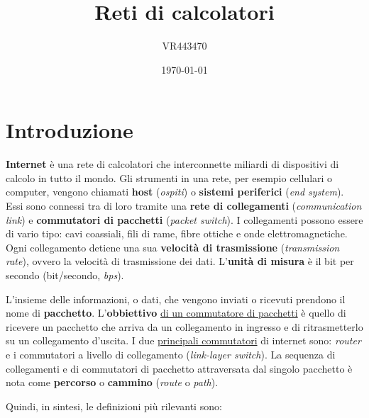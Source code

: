 \documentclass[a4paper]{article}
\begin{document}
	\author{VR443470}
	\title{Reti di calcolatori}
	\date{\printdayoff\today}
	\maketitle
	
	\newpage
	
	\tableofcontents
	
	\newpage
	
	\section{Introduzione}
	
	\textbf{Internet} è una rete di calcolatori che interconnette miliardi di dispositivi di calcolo in tutto il mondo. Gli strumenti in una rete, per esempio cellulari o computer, vengono chiamati \textbf{host} (\emph{ospiti}) o \textbf{sistemi periferici} (\emph{end system}). Essi sono connessi tra di loro tramite una \textbf{rete di collegamenti} (\emph{communication link}) e \textbf{commutatori di pacchetti} (\emph{packet switch}). I collegamenti possono essere di vario tipo: cavi coassiali, fili di rame, fibre ottiche e onde elettromagnetiche. \newline
	Ogni collegamento detiene una sua \textbf{velocità di trasmissione} (\emph{transmission rate}), ovvero la velocità di trasmissione dei dati. L’\textbf{unità di misura} è il bit per secondo (bit/secondo, \emph{bps}).
	
	L’insieme delle informazioni, o dati, che vengono inviati o ricevuti prendono il nome di \textbf{pacchetto}. L’\textbf{obbiettivo} \underline{di un commutatore di pacchetti} è quello di ricevere un pacchetto che arriva da un collegamento in ingresso e di ritrasmetterlo su un collegamento d’uscita. I due \underline{principali commutatori} di internet sono: \emph{router} e i commutatori a livello di collegamento (\emph{link-layer switch}). La sequenza di collegamenti e di commutatori di pacchetto attraversata dal singolo pacchetto è nota come \textbf{percorso} o \textbf{cammino} (\emph{route} o \emph{path}).
	
	Quindi, in sintesi, le definizioni più rilevanti sono:
	
\end{document}

